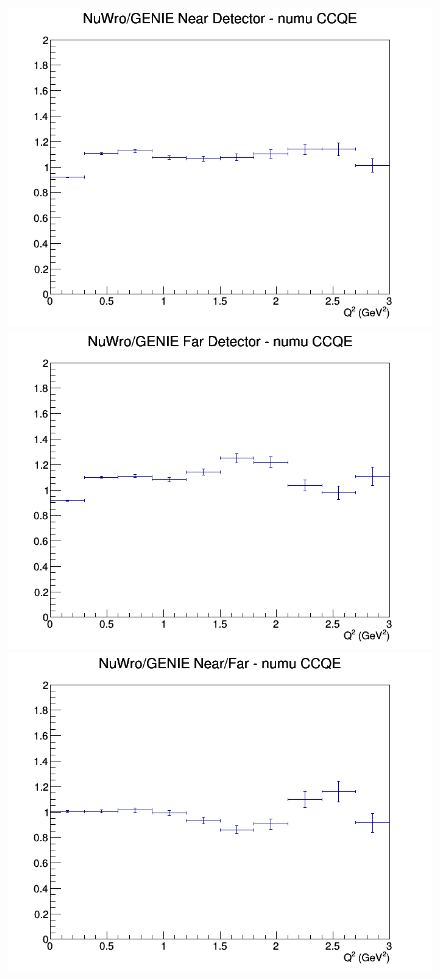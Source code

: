 \begin{figure}[h]
\endminipage
\newline
{}
\includegraphics[width=\linewidth]{eff_Q2/LAr/ratios/CCQE_NuWro_GENIE_numu_near_Q2.png}
\endminipage
{}
\includegraphics[width=\linewidth]{eff_Q2/LAr/ratios/CCQE_NuWro_GENIE_numu_far_Q2.png}
\endminipage
{}
\includegraphics[width=\linewidth]{eff_Q2/LAr/ratios/CCQE_NuWro_GENIE_numu_NF_Q2.png}
\endminipage
\newline
\end{figure}
\clearpage
